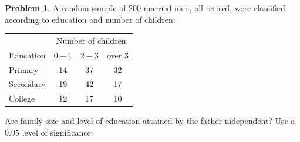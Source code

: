 \documentclass[11pt,a4paper]{article}
\theoremstyle{definition}
\newtheorem{problemx}{Problem}[section]
\newenvironment{problem}{\begin{problemx}}{\end{problemx}}
\begin{document}
\begin{problem}
A random sample of $200$ married men, all retired, were classified according to education
and number of children:
\begin{table}[H]
\centering
\begin{tabular}{l|ccc}
& \multicolumn{3}{c}{Number of children}\\
Education & $0-1$ & $2-3$ & over 3\\
\hline
Primary & 14 & 37 & 32\\
Secondary & 19 & 42 & 17\\
College & 12 & 17 & 10\\
\end{tabular}
\end{table}
Are family size and level of education attained by the father independent? Use a $0.05$
level of significance.
\end{problem}
\end{document}
